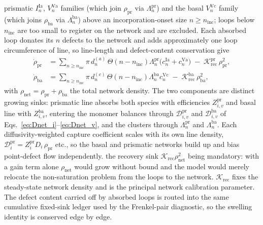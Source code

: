 prismatic $I_n^{\mathrm{Ia}}$, $V_n^{\mathrm{Va}}$ families (which join $\rho_{\mathrm{pr}}$ via $\Lambda_n^{\mathrm{pr}}$) and the basal $V_n^{\mathrm{Vc}}$ family (which joins $\rho_{\mathrm{ba}}$ via $\Lambda_n^{\mathrm{ba}}$)
above an incorporation-onset size $n \ge n_{\mathrm{inc}}$; loops below
$n_{\mathrm{inc}}$ are too small to register on the network and are
excluded. Each absorbed loop donates its $n$ defects to the network and
adds approximately one loop circumference of line, so line-length and
defect-content conservation give
\begin{align}
  \dot\rho_{\mathrm{pr}} &=
  \sum_{n\ge n_{\mathrm{inc}}} \pi\,d_n^{(a)}\,\Theta(n-n_{\mathrm{inc}})\Lambda_n^{\mathrm{pr}}\big(c_n^{\mathrm{Ia}}+c_n^{\mathrm{Va}}\big)
  \;-\; \mathcal{K}_{\mathrm{rec}}^{\mathrm{pr}}\,\rho_{\mathrm{pr}}^{2},
  \label{eq:zr_rho_pr}\\[4pt]
  \dot\rho_{\mathrm{ba}} &=
  \sum_{n\ge n_{\mathrm{inc}}} \pi\,d_n^{(c)}\,\Theta(n-n_{\mathrm{inc}})\Lambda_n^{\mathrm{ba}}c_n^{\mathrm{Vc}}
  \;-\; \mathcal{K}_{\mathrm{rec}}^{\mathrm{ba}}\,\rho_{\mathrm{ba}}^{2},
  \label{eq:zr_rho_ba}
\end{align}
with $\rho_{\mathrm{net}}=\rho_{\mathrm{pr}}+\rho_{\mathrm{ba}}$ the total network density. The two components are distinct growing sinks: prismatic line absorbs both species with efficiencies $Z_{i,v}^{\mathrm{pr}}$ and basal line with $Z_{i,v}^{\mathrm{ba}}$, entering the monomer balances through $\mathcal D_{i,v}^{\mathrm{pr}}$ and $\mathcal D_{i,v}^{\mathrm{ba}}$ of Eqs.~\eqref{eq:Dnet_i}--\eqref{eq:Dnet_v}, and the clusters through $\Lambda_n^{\mathrm{pr}}$ and $\Lambda_n^{\mathrm{ba}}$. Each diffusivity-weighted capture coefficient scales with its own line density, $\mathcal D_{i}^{\mathrm{pr}}=Z_i^{\mathrm{pr}}D_i\,\rho_{\mathrm{pr}}$ etc., so the basal and prismatic networks build up and bias point-defect flow independently.
the recovery sink $\mathcal{K}_{\mathrm{rec}}\rho_{\mathrm{net}}^{2}$ being
mandatory: with a gain term alone $\rho_{\mathrm{net}}$ would grow without
bound and the model would merely relocate the non-saturation problem from
the loops to the network. $\mathcal{K}_{\mathrm{rec}}$ fixes the
steady-state network density and is the principal network calibration
parameter. The defect content carried off by absorbed loops is routed into
the same cumulative fixed-sink ledger used by the Frenkel-pair diagnostic,
so the swelling identity is conserved edge by edge.

